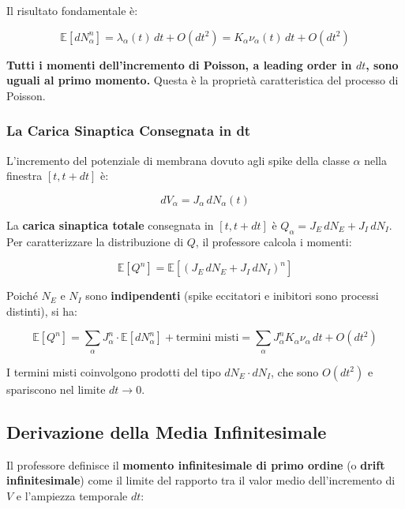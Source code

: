 Il risultato fondamentale è:

\begin{equation}
\mathbb{E}[dN_\alpha^n] = \lambda_\alpha(t)\, dt + O(dt^2) = K_\alpha \nu_\alpha(t)\, dt + O(dt^2)
\end{equation}

\textbf{Tutti i momenti dell'incremento di Poisson, a leading order in $dt$, sono uguali al primo momento.} Questa è la proprietà caratteristica del processo di Poisson.

\subsubsection{La Carica Sinaptica Consegnata in dt}

L'incremento del potenziale di membrana dovuto agli spike della classe $\alpha$ nella finestra $[t, t+dt]$ è:

\begin{equation}
dV_\alpha = J_\alpha\, dN_\alpha(t)
\end{equation}

La \textbf{carica sinaptica totale} consegnata in $[t, t+dt]$ è $Q_\alpha = J_E\, dN_E + J_I\, dN_I$. Per caratterizzare la distribuzione di $Q$, il professore calcola i momenti:

\begin{equation}
\mathbb{E}[Q^n] = \mathbb{E}[(J_E\, dN_E + J_I\, dN_I)^n]
\end{equation}

Poiché $N_E$ e $N_I$ sono \textbf{indipendenti} (spike eccitatori e inibitori sono processi distinti), si ha:

\begin{equation}
\mathbb{E}[Q^n] = \sum_{\alpha} J_\alpha^n \cdot \mathbb{E}[dN_\alpha^n] + \text{termini misti} = \sum_\alpha J_\alpha^n K_\alpha \nu_\alpha\, dt + O(dt^2)
\end{equation}

I termini misti coinvolgono prodotti del tipo $dN_E \cdot dN_I$, che sono $O(dt^2)$ e spariscono nel limite $dt \to 0$.



\subsection{Derivazione della Media Infinitesimale}

Il professore definisce il \textbf{momento infinitesimale di primo ordine} (o \textbf{drift infinitesimale}) come il limite del rapporto tra il valor medio dell'incremento di $V$ e l'ampiezza temporale $dt$:

